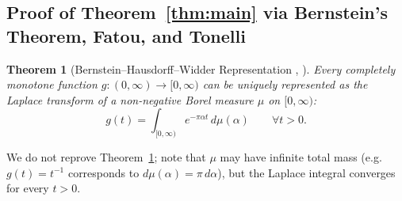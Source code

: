 \documentclass[11pt, a4paper]{article}
\newtheorem{theorem}{Theorem}[section]
\theoremstyle{definition}
\theoremstyle{remark}
\begin{document}
\subsection{Proof of Theorem~\ref{thm:main} via Bernstein's Theorem, Fatou, and Tonelli}
\label{sec:bernstein}

\begin{theorem}[Bernstein--Hausdorff--Widder Representation , ]
\label{thm:bernstein}
Every completely monotone function $g : (0, \infty) \to [0, \infty)$ can be uniquely represented as the Laplace transform of a non-negative Borel measure $\mu$ on $[0, \infty)$:
\begin{equation}
\label{eq:bernstein}
g(t) = \int_{[0, \infty)} e^{-\pi \alpha t} \, d\mu(\alpha) \qquad \forall t > 0.
\end{equation}
\end{theorem}

\noindent We do not reprove Theorem~\ref{thm:bernstein}; note that $\mu$ may have infinite total mass (e.g.\ $g(t) = t^{-1}$ corresponds to $d\mu(\alpha) = \pi \, d\alpha$), but the Laplace integral converges for every $t > 0$.
\end{document}
